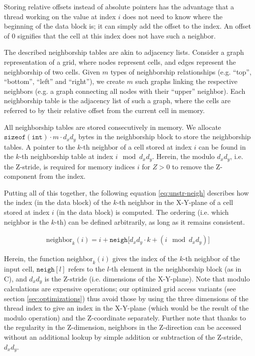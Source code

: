 Storing relative offsets instead of absolute pointers has the advantage that a thread working on the value at index $i$ does not need to know where the beginning of the data block is; it can simply add the offset to the index. An offset of $0$ signifies that the cell at this index does not have such a neighbor.

The described neighborship tables are akin to adjacency lists\cite[Chapter 12]{DSA}. Consider a graph representation of a grid, where nodes represent cells, and edges represent the neighborship of two cells. Given $m$ types of neighborship relationships (e.g. ``top'', ``bottom'', ``left'' and ``right''), we create $m$ such graphs linking the respective neighbors (e.g. a graph connecting all nodes with their ``upper'' neighbor). Each neighborship table is the adjacency list of such a graph, where the cells are referred to by their relative offset from the current cell in memory. 

All neighborship tables are stored consecutively in memory. We allocate $\mathtt{sizeof(int)}\cdot m \cdot d_x d_y$ bytes in the neighborship block to store the neighborship tables. A pointer to the $k$-th neighbor of a cell stored at index $i$ can be found in the $k$-th neighborship table at index $i \mod d_xd_y$. Herein, the modulo $d_xd_y$, i.e. the Z-stride, is required for memory indices $i$ for $Z>0$ to remove the Z-component from the index.

Putting all of this together, the following equation \ref{eq:unstr-neigh} describes how the index (in the data block) of the $k$-th neighbor in the X-Y-plane of a cell stored at index $i$ (in the data block) is computed. The ordering (i.e. which neighbor is the $k$-th) can be defined arbitrarily, as long as it remains consistent.

\begin{gather}
    \text{neighbor}_k(i) = i + \mathtt{neigh[}d_xd_y\cdot k + (i \mod d_xd_y)\mathtt{]} \label{eq:unstr-neigh}
\end{gather}

Herein, the function $\text{neighbor}_k(i)$ gives the index of the $k$-th neighbor of the input cell, $\mathtt{neigh}[l]$ refers to the $l$-th element in the neighborship block (as in C), and $d_xd_y$ is the Z-stride (i.e. dimensions of the X-Y-plane). Note that modulo calculations are expensive operations; our optimized grid access variants (see section \ref{sec:optimizations}) thus avoid those by using the three dimensions of the thread index to give an index in the X-Y-plane (which would be the result of the modulo operation) and the Z-coordinate separately. Further note that thanks to the regularity in the Z-dimension, neighbors in the Z-direction can be accessed without an additional lookup by simple addition or subtraction of the Z-stride, $d_xd_y$.

